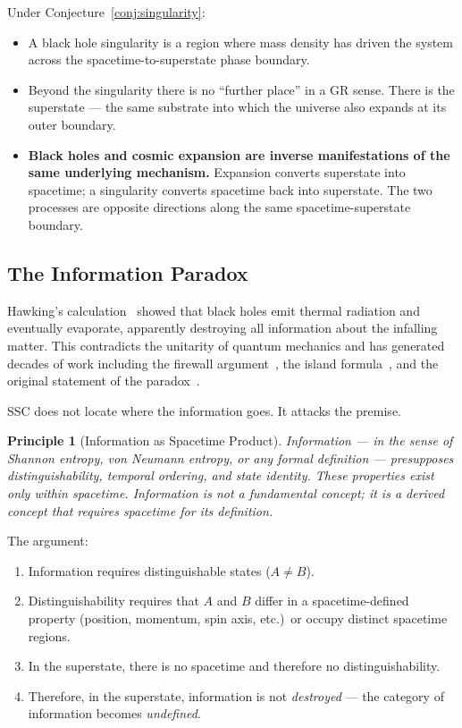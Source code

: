 \documentclass[12pt,a4paper]{article}
\newtheorem{principle}{Principle}
\begin{document}
Under Conjecture~\ref{conj:singularity}:
\begin{itemize}
  \item A black hole singularity is a region where mass density has
        driven the system across the spacetime-to-superstate phase
        boundary.
  \item Beyond the singularity there is no ``further place'' in a GR
        sense.  There is the superstate — the same substrate into
        which the universe also expands at its outer boundary.
  \item \textbf{Black holes and cosmic expansion are inverse
        manifestations of the same underlying mechanism.}  Expansion
        converts superstate into spacetime; a singularity converts
        spacetime back into superstate.  The two processes are
        opposite directions along the same spacetime-superstate
        boundary.
\end{itemize}

\subsection{The Information Paradox}
\label{sec:information}

Hawking's calculation~\citep{hawking1975} showed that black holes emit
thermal radiation and eventually evaporate, apparently destroying all
information about the infalling matter.  This contradicts the unitarity
of quantum mechanics and has generated decades of work including the
firewall argument~\citep{almheiri2013}, the island
formula~\citep{penington2020,almheiri2020}, and the original statement
of the paradox~\citep{hawking2005}.

SSC does not locate where the information goes.  It attacks the
premise.

\begin{principle}[Information as Spacetime Product]
\label{pr:information}
Information — in the sense of Shannon entropy, von Neumann entropy,
or any formal definition — presupposes distinguishability, temporal
ordering, and state identity.  These properties exist only within
spacetime.  Information is not a fundamental concept; it is a
derived concept that requires spacetime for its definition.
\end{principle}

\noindent
The argument:
\begin{enumerate}
  \item Information requires distinguishable states (\(A \neq B\)).
  \item Distinguishability requires that \(A\) and \(B\) differ in a
        spacetime-defined property (position, momentum, spin axis,
        etc.)\ or occupy distinct spacetime regions.
  \item In the superstate, there is no spacetime and therefore no
        distinguishability.
  \item Therefore, in the superstate, information is not
        \emph{destroyed} — the category of information becomes
        \emph{undefined}.
\end{enumerate}
\end{document}

